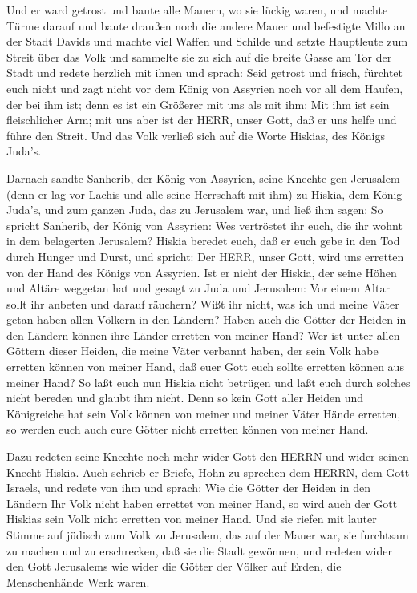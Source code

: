  Und er ward getrost und baute alle Mauern, wo sie lückig
waren, und machte Türme darauf und baute draußen noch die andere Mauer
und befestigte Millo an der Stadt Davids und machte viel Waffen und
Schilde  und setzte Hauptleute zum Streit über das Volk und
sammelte sie zu sich auf die breite Gasse am Tor der Stadt und redete
herzlich mit ihnen und sprach:  Seid getrost und frisch,
fürchtet euch nicht und zagt nicht vor dem König von Assyrien noch vor
all dem Haufen, der bei ihm ist; denn es ist ein Größerer mit uns als
mit ihm:  Mit ihm ist sein fleischlicher Arm; mit uns aber
ist der HERR, unser Gott, daß er uns helfe und führe den Streit. Und das
Volk verließ sich auf die Worte Hiskias, des Königs Juda's.

 Darnach sandte Sanherib, der König von Assyrien, seine
Knechte gen Jerusalem (denn er lag vor Lachis und alle seine Herrschaft
mit ihm) zu Hiskia, dem König Juda's, und zum ganzen Juda, das zu
Jerusalem war, und ließ ihm sagen:  So spricht Sanherib,
der König von Assyrien: Wes vertröstet ihr euch, die ihr wohnt in dem
belagerten Jerusalem?  Hiskia beredet euch, daß er euch
gebe in den Tod durch Hunger und Durst, und spricht: Der HERR, unser
Gott, wird uns erretten von der Hand des Königs von Assyrien.
 Ist er nicht der Hiskia, der seine Höhen und Altäre
weggetan hat und gesagt zu Juda und Jerusalem: Vor einem Altar sollt ihr
anbeten und darauf räuchern?  Wißt ihr nicht, was ich und
meine Väter getan haben allen Völkern in den Ländern? Haben auch die
Götter der Heiden in den Ländern können ihre Länder erretten von meiner
Hand?  Wer ist unter allen Göttern dieser Heiden, die meine
Väter verbannt haben, der sein Volk habe erretten können von meiner
Hand, daß euer Gott euch sollte erretten können aus meiner Hand?
 So laßt euch nun Hiskia nicht betrügen und laßt euch durch
solches nicht bereden und glaubt ihm nicht. Denn so kein Gott aller
Heiden und Königreiche hat sein Volk können von meiner und meiner Väter
Hände erretten, so werden euch auch eure Götter nicht erretten können
von meiner Hand.

 Dazu redeten seine Knechte noch mehr wider Gott den HERRN
und wider seinen Knecht Hiskia.  Auch schrieb er Briefe,
Hohn zu sprechen dem HERRN, dem Gott Israels, und redete von ihm und
sprach: Wie die Götter der Heiden in den Ländern Ihr Volk nicht haben
errettet von meiner Hand, so wird auch der Gott Hiskias sein Volk nicht
erretten von meiner Hand.  Und sie riefen mit lauter Stimme
auf jüdisch zum Volk zu Jerusalem, das auf der Mauer war, sie furchtsam
zu machen und zu erschrecken, daß sie die Stadt gewönnen, 
und redeten wider den Gott Jerusalems wie wider die Götter der Völker
auf Erden, die Menschenhände Werk waren.

